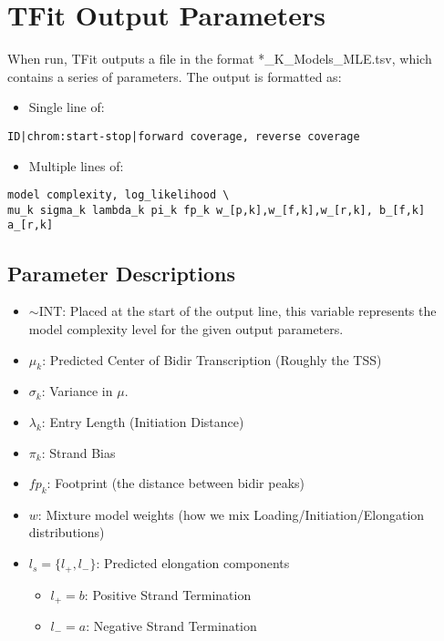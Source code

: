 \hypertarget{tfit-output-parameters}{%
\section{TFit Output Parameters}\label{tfit-output-parameters}}

When run, TFit outputs a file in the format *\_K\_Models\_MLE.tsv, which
contains a series of parameters. The output is formatted as:

\begin{itemize}
\tightlist
\item
  Single line of:
\end{itemize}

\begin{verbatim}
ID|chrom:start-stop|forward coverage, reverse coverage
\end{verbatim}

\begin{itemize}
\tightlist
\item
  Multiple lines of:
\end{itemize}

\begin{verbatim}
model complexity, log_likelihood \
mu_k sigma_k lambda_k pi_k fp_k w_[p,k],w_[f,k],w_[r,k], b_[f,k] a_[r,k]
\end{verbatim}

\hypertarget{parameter-descriptions}{%
\subsection{Parameter Descriptions}\label{parameter-descriptions}}

\begin{itemize}
\tightlist
\item
  \(\sim\text{INT}\): Placed at the start of the output line, this
  variable represents the model complexity level for the given output
  parameters.
\item
  \(\mu_k\): Predicted Center of Bidir Transcription (Roughly the TSS)
\item
  \(\sigma_k\): Variance in \(\mu\).
\item
  \(\lambda_k\): Entry Length (Initiation Distance)
\item
  \(\pi_k\): Strand Bias
\item
  \(fp_k\): Footprint (the distance between bidir peaks)
\item
  \(w\): Mixture model weights (how we mix Loading/Initiation/Elongation
  distributions)
\item
  \(l_s = \{l_+,l_-\}\): Predicted elongation components

  \begin{itemize}
  \tightlist
  \item
    \(l_+ = b\): Positive Strand Termination
  \item
    \(l_- = a\): Negative Strand Termination
  \end{itemize}
\end{itemize}
